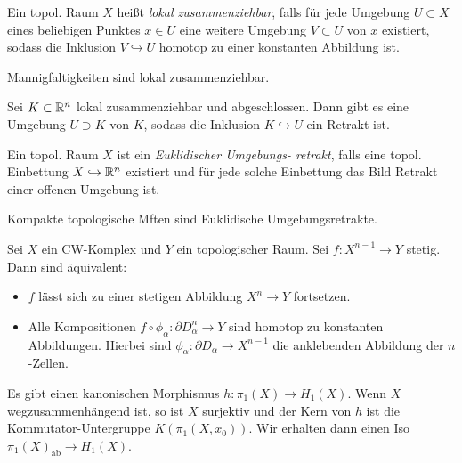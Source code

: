 \documentclass{cheat-sheet}
\begin{document}
\begin{defn}
  Ein topol. Raum $X$ heißt \emph{lokal zusammenziehbar}, falls für jede Umgebung $U \subset X$ eines beliebigen Punktes $x \in U$ eine weitere Umgebung $V \subset U$ von $x$ existiert, sodass die Inklusion $V \hookrightarrow U$ homotop zu einer konstanten Abbildung ist.
\end{defn}

\begin{lem}
  Mannigfaltigkeiten sind lokal zusammenziehbar.
\end{lem}

\begin{satz}
  Sei $K \subset \mathbb{R}^n$ lokal zusammenziehbar und abgeschlossen. Dann gibt es eine Umgebung $U \supset K$ von $K$, sodass die Inklusion $K \hookrightarrow U$ ein Retrakt ist.
\end{satz}

\begin{defn}
  Ein topol. Raum $X$ ist ein \emph{Euklidischer Umgebungs- retrakt}, falls eine topol. Einbettung $X \hookrightarrow \mathbb{R}^n$ existiert und für jede solche Einbettung das Bild Retrakt einer offenen Umgebung ist.
\end{defn}

\begin{kor}
  Kompakte topologische Mften sind Euklidische Umgebungsretrakte.
\end{kor}

\begin{prop}
  Sei $X$ ein CW-Komplex und $Y$ ein topologischer Raum. Sei $f : X^{n-1} \to Y$ stetig. Dann sind äquivalent:
  \begin{itemize}
    \item $f$ lässt sich zu einer stetigen Abbildung $X^n \to Y$ fortsetzen.
    \item Alle Kompositionen $f \circ \phi_\alpha : \partial D_\alpha^n \to Y$ sind homotop zu konstanten Abbildungen. Hierbei sind $\phi_\alpha : \partial D_\alpha \to X^{n-1}$ die anklebenden Abbildung der $n$-Zellen.
  \end{itemize}
\end{prop}


\begin{prop}
  Es gibt einen kanonischen Morphismus $h : \pi_1(X) \to H_1(X)$. Wenn $X$ wegzusammenhängend ist, so ist $X$ surjektiv und der Kern von $h$ ist die Kommutator-Untergruppe $K(\pi_1(X, x_0))$. Wir erhalten dann einen Iso $\pi_1(X)_{\text{ab}} \to H_1(X)$.
\end{prop}
\end{document}
